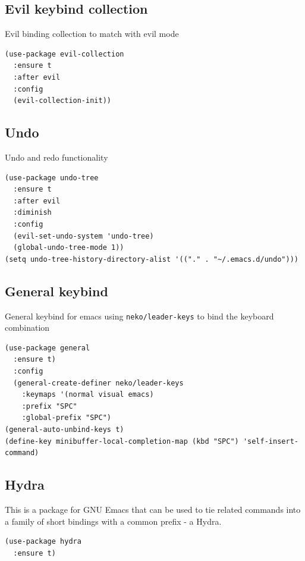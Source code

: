 \documentclass[11pt]{article}
\begin{document}
\subsection{Evil keybind collection}
\label{sec:orgb7af7dd}

Evil binding collection to match with evil mode

\begin{verbatim}
(use-package evil-collection
  :ensure t
  :after evil
  :config
  (evil-collection-init))
\end{verbatim}

\subsection{Undo}
\label{sec:org190dfc1}

Undo and redo functionality

\begin{verbatim}
(use-package undo-tree
  :ensure t
  :after evil
  :diminish
  :config
  (evil-set-undo-system 'undo-tree)
  (global-undo-tree-mode 1))
(setq undo-tree-history-directory-alist '(("." . "~/.emacs.d/undo")))

\end{verbatim}

\subsection{General keybind}
\label{sec:orgfbe37a5}

General keybind for emacs using \texttt{neko/leader-keys} to bind the keyboard combination

\begin{verbatim}
(use-package general
  :ensure t)
  :config
  (general-create-definer neko/leader-keys
    :keymaps '(normal visual emacs)
    :prefix "SPC"
    :global-prefix "SPC")
(general-auto-unbind-keys t)
(define-key minibuffer-local-completion-map (kbd "SPC") 'self-insert-command)
\end{verbatim}

\subsection{Hydra}
\label{sec:org1542c50}

This is a package for GNU Emacs that can be used to tie related commands into a family of short bindings with a common prefix - a Hydra.

\begin{verbatim}
(use-package hydra
  :ensure t)
\end{verbatim}
\end{document}
